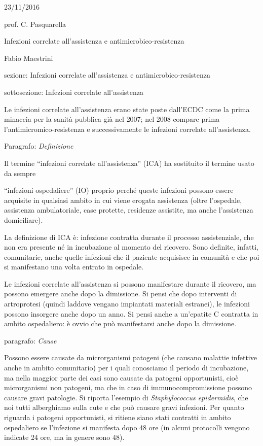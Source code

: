 \documentclass[]{article}
\date{}
\begin{document}
23/11/2016

prof. C. Pasquarella

Infezioni correlate all'assistenza e antimicrobico-resistenza

Fabio Maestrini

sezione: Infezioni correlate all'assistenza e antimicrobico-resistenza

sottosezione: Infezioni correlate all'assistenza

Le infezioni correlate all'assistenza erano state poste dall'ECDC come
la prima minaccia per la sanità pubblica già nel 2007; nel 2008 compare
prima l'antimicromico-resistenza e successivamente le infezioni
correlate all'assistenza.

Paragrafo: \emph{Definizione}

Il termine ``infezioni correlate all'assistenza'' (ICA) ha sostituito il
termine usato da sempre

``infezioni ospedaliere'' (IO) proprio perché queste infezioni possono
essere acquisite in qualsiasi ambito in cui viene erogata assistenza
(oltre l'ospedale, assistenza ambulatoriale, case protette, residenze
assistite, ma anche l'assistenza domiciliare).

La definizione di ICA è: infezione contratta durante il processo
assistenziale, che non era presente né in incubazione al momento del
ricovero. Sono definite, infatti, comunitarie, anche quelle infezioni
che il paziente acquisisce in comunità e che poi si manifestano una
volta entrato in ospedale.

Le infezioni correlate all'assistenza si possono manifestare durante il
ricovero, ma possono emergere anche dopo la dimissione. Si pensi che
dopo interventi di artroprotesi (quindi laddove vengano impiantati
materiali estranei), le infezioni possono insorgere anche dopo un anno.
Si pensi anche a un'epatite C contratta in ambito ospedaliero: è ovvio
che può manifestarsi anche dopo la dimissione.

paragrafo: \emph{Cause}

Possono essere causate da microrganismi patogeni (che causano malattie
infettive anche in ambito comunitario) per i quali conosciamo il periodo
di incubazione, ma nella maggior parte dei casi sono causate da patogeni
opportunisti, cioè microrganismi non patogeni, ma che in caso di
immunocompromissione possono causare gravi patologie. Si riporta
l'esempio di \emph{Staphylococcus epidermidis}, che noi tutti
alberghiamo sulla cute e che può causare gravi infezioni. Per quanto
riguarda i patogeni opportunisti, si ritiene siano stati contratti in
ambito ospedaliero se l'infezione si manifesta dopo 48 ore (in alcuni
protocolli vengono indicate 24 ore, ma in genere sono 48).
\end{document}

